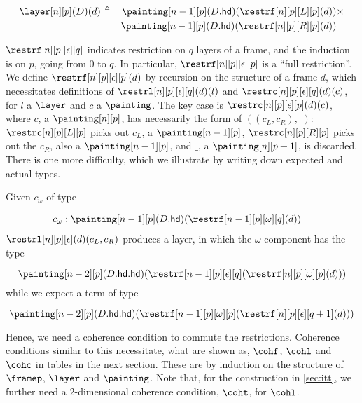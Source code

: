 \documentclass[10pt]{art.cls/art}
\newcommand{\defeq}{\ensuremath{\triangleq}}
\newcommand{\hd}{\ensuremath{\mathsf{hd}}}
\begin{document}
\begin{align*}
  \layer[n][p](D)(d) & \defeq & \painting[n-1][p](D.\hd)(\restrf[n][p][L][p](d)) & \times \\
                     &        & \painting[n-1][p](D.\hd)(\restrf[n][p][R][p](d)) &
\end{align*}

$\restrf[n][p][\epsilon][q]$ indicates restriction on $q$ layers of a frame, and the induction is on $p$, going from $0$ to $q$. In particular, $\restrf[n][p][\epsilon][p]$ is a ``full restriction''. We define $\restrf[n][p][\epsilon][p](d)$ by recursion on the structure of a frame $d$, which necessitates definitions of $\restrl[n][p][\epsilon][q](d)(l)$ and $\restrc[n][p][\epsilon][q](d)(c)$, for $l$ a $\layer$ and $c$ a $\painting$. The key case is $\restrc[n][p][\epsilon][p](d)(c)$, where $c$, a $\painting[n][p]$, has necessarily the form of $((c_L, c_R), \_)$: $\restrc[n][p][L][p]$ picks out $c_L$, a $\painting[n-1][p]$, $\restrc[n][p][R][p]$ picks out the $c_R$, also a $\painting[n-1][p]$, and $\_$, a $\painting[n][p+1]$, is discarded. There is one more difficulty, which we illustrate by writing down expected and actual types.

Given $c_\omega$ of type

\begin{align*}
  c_\omega & : \painting[n-1][p](D.\hd)(\restrf[n-1][p][\omega][q](d))
\end{align*}
$\restrl[n][p][\epsilon](d)(c_L, c_R)$ produces a layer, in which the $\omega$-component has the type

\begin{equation*}
  \painting[n-2][p](D.\hd.\hd)(\restrf[n-1][p][\epsilon][q](\restrf[n][p][\omega][p](d)))
\end{equation*}
while we expect a term of type

\begin{equation*}
  \painting[n-2][p](D.\hd.\hd)(\restrf[n-1][p][\omega][p](\restrf[n][p][\epsilon][q+1](d)))
\end{equation*}

Hence, we need a coherence condition to commute the restrictions. Coherence conditions similar to this necessitate, what are shown as, $\cohf$, $\cohl$ and $\cohc$ in tables in the next section. These are by induction on the structure of $\framep$, $\layer$ and $\painting$. Note that, for the construction in \ref{sec:itt}, we further need a $2$-dimensional coherence condition, $\coht$, for $\cohl$.
\end{document}
